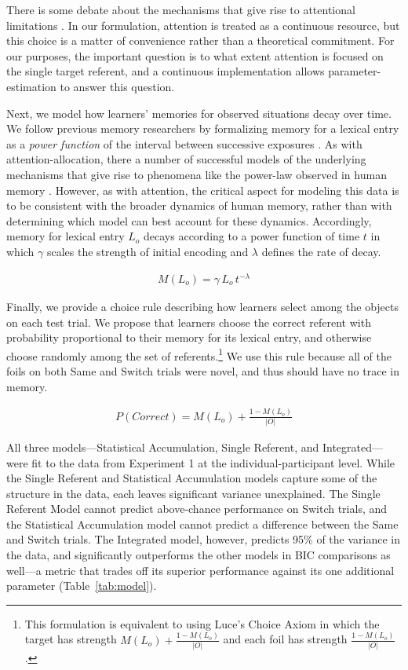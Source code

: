 \documentclass{pnastwo}
\begin{document}
\begin{article}
There is some debate about the mechanisms that give rise to attentional limitations \citep[e.g.][]{Wei2012}. In our formulation, attention is treated as a continuous resource, but this choice is a matter of convenience rather than a theoretical commitment. For our purposes, the important question is to what extent attention is focused on the single target referent, and a continuous implementation allows parameter-estimation to answer this question.

Next, we model how learners' memories for observed situations decay over time. We follow previous memory researchers by formalizing memory for a lexical entry as a \emph{power function} of the interval between successive exposures \citep{Anderson1991a}. As with attention-allocation, there a number of successful models of the underlying mechanisms that give rise to phenomena like the power-law observed in human memory \citep[e.g.,][]{Murdock1982, Shiffrin1997}. However, as with attention, the critical aspect for modeling this data is to be consistent with the broader dynamics of human memory, rather than with determining which model can best account for these dynamics. Accordingly, memory for lexical entry $L_{o}$ decays according to a power function of time $t$ in which $\gamma$ scales the strength of initial encoding and $\lambda$ defines the rate of decay.

\begin{align}
M(L_{o}) = \gamma \, L_{o} \, t^{-\lambda}
\end{align}

Finally, we provide a choice rule describing how learners select among the objects on each test trial. We propose that learners choose the correct referent with probability proportional to their memory for its lexical entry, and otherwise choose randomly among the set of referents.\footnote{This formulation is equivalent to using Luce's Choice Axiom \citep{Luce1959} in which the target has strength  $M(L_{o}) + \frac{1-M(L_{o})}{|O|}$ and each foil has strength $\frac{1-M(L_{o})}{|O|}$.} We use this rule because all of the foils on both Same and Switch trials were novel, and thus should have no trace in memory.

\begin{align}
P(Correct) = M(L_{o}) + \frac{1-M(L_{o})}{|O|}
\end{align}

All three models---Statistical Accumulation, Single Referent, and Integrated---were fit to the data from Experiment 1 at the individual-participant level. While the Single Referent and Statistical Accumulation models capture some of the structure in the data, each leaves significant variance unexplained. The Single Referent Model cannot predict above-chance performance on Switch trials, and the Statistical Accumulation model cannot predict a difference between the Same and Switch trials. The Integrated model, however, predicts 95\% of the variance in the data, and significantly outperforms the other models in BIC comparisons as well---a metric that trades off its superior performance against its one additional parameter (Table~\ref{tab:model}).


\end{article}
\end{document}
